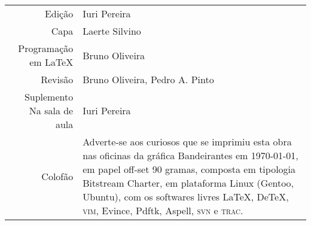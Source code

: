 
\newcommand{\putline}[2]{#1 & #2\\}

%
\ifodd\thepage\paginabranca\else\clearpage\fi
\pagebreak
\thispagestyle{empty}

\noindent\begin{tabular}{rp{}}\small
    \putline{Edição}{Iuri Pereira}
		\putline{Capa}{Laerte Silvino}
		\putline{Programação em \LaTeX}{Bruno Oliveira}
		\putline{Revisão}{Bruno Oliveira, Pedro A. Pinto}
		\putline{Suplemento Na sala de aula}{Iuri Pereira}
		\putline{Colofão}{Adverte-se aos curiosos que se
			imprimiu esta obra nas oficinas da gráfica
			Bandeirantes em \today, em papel 
			\mbox{off-set} 90 gramas,
			composta em tipologia Bitstream Charter, 
			em plataforma Linux (Gentoo, Ubuntu), 
			com os softwares livres 
			\LaTeX, De\TeX, \textsc{vim}, Evince, Pdftk, 
			Aspell, \textsc{svn} e \textsc{trac}.}
\end{tabular}

